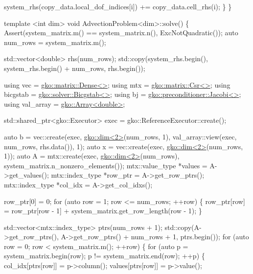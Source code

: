 \begin{DoxyCodeInclude}
        system\_rhs(copy\_data.local\_dof\_indices[i]) += copy\_data.cell\_rhs(i);
    \}
\}

\textcolor{keyword}{template} <\textcolor{keywordtype}{int} dim>
\textcolor{keywordtype}{void} AdvectionProblem<dim>::solve()
\{
    Assert(system\_matrix.m() == system\_matrix.n(), ExcNotQuadratic());
    \textcolor{keyword}{auto} num\_rows = system\_matrix.m();

    std::vector<double> rhs(num\_rows);
    std::copy(system\_rhs.begin(), system\_rhs.begin() + num\_rows, rhs.begin());

    \textcolor{keyword}{using} vec = \hyperlink{classgko_1_1matrix_1_1Dense}{gko::matrix::Dense<>};
    \textcolor{keyword}{using} mtx = \hyperlink{classgko_1_1matrix_1_1Csr}{gko::matrix::Csr<>};
    \textcolor{keyword}{using} bicgstab = \hyperlink{classgko_1_1solver_1_1Bicgstab}{gko::solver::Bicgstab<>};
    \textcolor{keyword}{using} bj = \hyperlink{classgko_1_1preconditioner_1_1Jacobi}{gko::preconditioner::Jacobi<>};
    \textcolor{keyword}{using} val\_array = \hyperlink{classgko_1_1Array}{gko::Array<double>};

    std::shared\_ptr<gko::Executor> exec = gko::ReferenceExecutor::create();

    \textcolor{keyword}{auto} b = vec::create(exec, \hyperlink{structgko_1_1dim}{gko::dim<2>}(num\_rows, 1),
                         val\_array::view(exec, num\_rows, rhs.data()), 1);
    \textcolor{keyword}{auto} x = vec::create(exec, \hyperlink{structgko_1_1dim}{gko::dim<2>}(num\_rows, 1));
    \textcolor{keyword}{auto} A = mtx::create(exec, \hyperlink{structgko_1_1dim}{gko::dim<2>}(num\_rows),
                         system\_matrix.n\_nonzero\_elements());
    mtx::value\_type *values = A->get\_values();
    mtx::index\_type *row\_ptr = A->get\_row\_ptrs();
    mtx::index\_type *col\_idx = A->get\_col\_idxs();

    row\_ptr[0] = 0;
    \textcolor{keywordflow}{for} (\textcolor{keyword}{auto} row = 1; row <= num\_rows; ++row) \{
        row\_ptr[row] = row\_ptr[row - 1] + system\_matrix.get\_row\_length(row - 1);
    \}

    std::vector<mtx::index\_type> ptrs(num\_rows + 1);
    std::copy(A->get\_row\_ptrs(), A->get\_row\_ptrs() + num\_rows + 1,
              ptrs.begin());
    \textcolor{keywordflow}{for} (\textcolor{keyword}{auto} row = 0; row < system\_matrix.m(); ++row) \{
        \textcolor{keywordflow}{for} (\textcolor{keyword}{auto} p = system\_matrix.begin(row); p != system\_matrix.end(row);
             ++p) \{
            col\_idx[ptrs[row]] = p->column();
            values[ptrs[row]] = p->value();


\end{DoxyCodeInclude}
